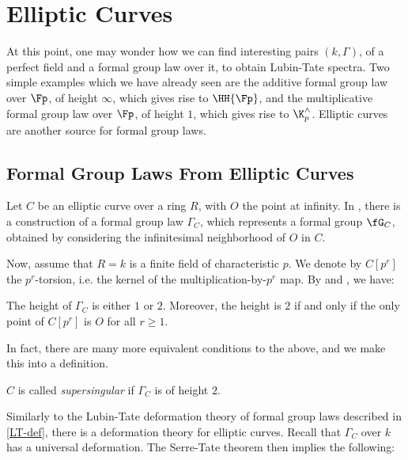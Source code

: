 \section{Elliptic Curves}

At this point, one may wonder how we can find interesting pairs $\left(k, \Gamma\right)$, of a perfect field and a formal group law over it, to obtain Lubin-Tate spectra.
Two simple examples which we have already seen are the additive formal group law over $\Fp$, of height $\infty$, which gives rise to $\HH{\Fp}$, and the multiplicative formal group law over $\Fp$, of height $1$, which gives rise to $\K_p^\wedge$.
Elliptic curves are another source for formal group laws.



\subsection{Formal Group Laws From Elliptic Curves}

Let $C$ be an elliptic curve over a ring $R$, with $O$ the point at infinity.
In \cite[IV]{Sil}, there is a construction of a formal group law $\Gamma_C$, which represents a formal group $\fG_C$, obtained by considering the infinitesimal neighborhood of $O$ in $C$.

Now, assume that $R = k$ is a finite field of characteristic $p$.
We denote by $C\left[p^r\right]$ the $p^r$-torsion, i.e. the kernel of the multiplication-by-$p^r$ map.
By \cite[IV.7.5]{Sil} and \cite[V.3.1]{Sil}, we have:

\begin{proposition}\label{height-torsion}
	The height of $\Gamma_C$ is either $1$ or $2$.
	Moreover, the height is $2$ if and only if the only point of $C\left[p^r\right]$ is $O$ for all $r \geq 1$.
\end{proposition}

In fact, there are many more equivalent conditions to the above, and we make this into a definition.

\begin{definition}
	$C$ is called \emph{supersingular} if $\Gamma_C$ is of height $2$.
\end{definition}

Similarly to the Lubin-Tate deformation theory of formal group laws described in \ref{LT-def}, there is a deformation theory for elliptic curves.
Recall that $\Gamma_C$ over $k$ has a universal deformation.
The Serre-Tate theorem \cite[2.9.1]{KM} then implies the following:

